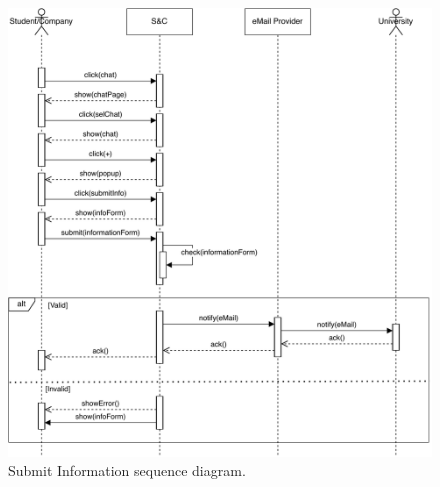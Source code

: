 \begin{figure}[H]
    \begin{center}
        \includegraphics[width=\linewidth]{Images/SequenceDiagram/SubmitInformationSD.pdf}
        \caption{Submit Information sequence diagram.}
        \label{fig:submit_info_seqdiag}%
    \end{center}
\end{figure}


